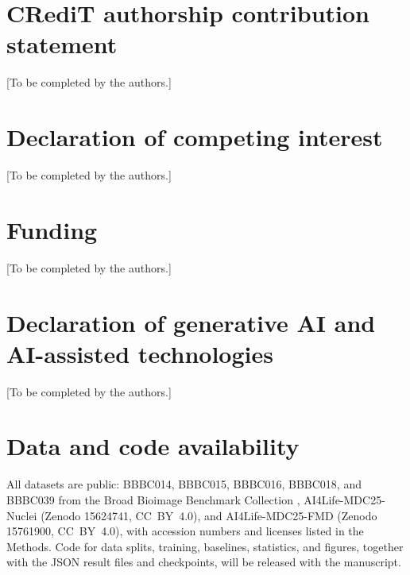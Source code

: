 \documentclass[preprint,12pt]{elsarticle}
\begin{document}
\section*{CRediT authorship contribution statement}
[To be completed by the authors.]

\section*{Declaration of competing interest}
[To be completed by the authors.]

\section*{Funding}
[To be completed by the authors.]

\section*{Declaration of generative AI and AI-assisted technologies}
[To be completed by the authors.]

\section*{Data and code availability}
All datasets are public: BBBC014, BBBC015, BBBC016, BBBC018, and BBBC039 from
the Broad Bioimage Benchmark Collection \cite{ljosa2012bbbc}, AI4Life-MDC25-Nuclei
\cite{ai4life_mdc25_2025} (Zenodo 15624741, CC~BY~4.0), and AI4Life-MDC25-FMD
\cite{ai4life_mdc25_fmd_2025} (Zenodo 15761900, CC~BY~4.0), with accession
numbers and licenses listed in the Methods. Code for data splits, training, baselines,
statistics, and figures, together with the JSON result files and checkpoints,
will be released with the manuscript.

\begingroup
\small


\endgroup
\end{document}
